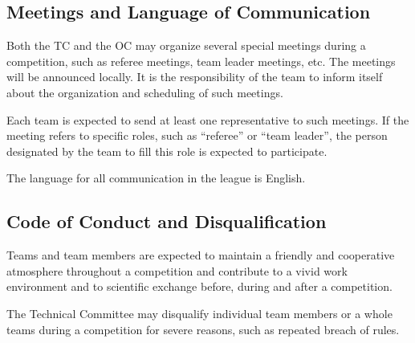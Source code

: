 \subsection{Meetings and Language of Communication}
Both the TC and the OC may organize several special meetings during a competition, such as referee meetings, team leader meetings, etc. The meetings will be announced locally. It is the responsibility of the team to inform itself about the organization and scheduling of such meetings.  
\par
Each team is expected to send at least one representative to such meetings. If the meeting refers to specific roles, such as “referee” or “team leader”, the person designated by the team to fill this role is expected to participate. 
\par
The language for all communication in the league is English.

\subsection{Code of Conduct and Disqualification}
Teams and team members are expected to maintain a friendly and cooperative atmosphere throughout a competition and contribute to a vivid work environment and to scientific exchange before, during and after a competition.
\par
The Technical Committee may disqualify individual team members or a whole teams during a competition for severe reasons, such as repeated breach of rules. 
